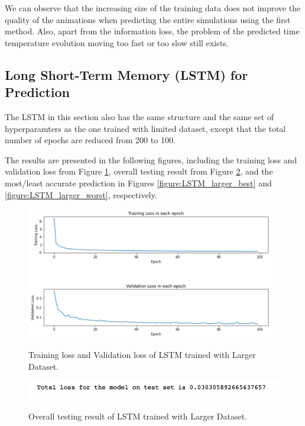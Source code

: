 We can observe that the increasing size of the training data does not improve the quality of the animations when predicting the entire simulations using the first method. Also, apart from the information loss, the problem of the predicted time temperature evolution moving too fast or too slow still exists.


\subsection{Long Short-Term Memory (LSTM) for Prediction}

The LSTM in this section also has the same structure and the same set of hyperparamters as the one trained with limited dataset, except that the total number of epochs are reduced from 200 to 100.

The results are presented in the following figures, including the training loss and validation loss from Figure \ref{figure:LSTM_larger_losses}, overall testing result from Figure \ref{figure:LSTM_larger_testing}, and the most/least accurate prediction in Figures \ref{figure:LSTM_larger_best} and \ref{figure:LSTM_larger_worst}, respectively.

\begin{figure}[H]
    \caption{Training loss and Validation loss of LSTM trained with Larger Dataset.}
    \includegraphics[scale=0.6]{figures/mantle_convection_images/larger_dataset/LSTM_trainingData.png}
    \label{figure:LSTM_larger_losses}
\end{figure}

\begin{figure}[H]
    \caption{Overall testing result of LSTM trained with Larger Dataset.}
    \includegraphics[scale=0.8]{figures/mantle_convection_images/larger_dataset/LSTM_OverallTesting.png}
    \label{figure:LSTM_larger_testing}
\end{figure}

